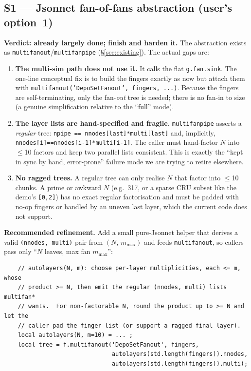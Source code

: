 \documentclass[11pt]{article}
\newcommand{\code}[1]{\texttt{#1}}
\begin{document}
\subsection{S1 --- Jsonnet fan-of-fans abstraction (user's option~1)}
\label{sec:s1}

\textbf{Verdict: already largely done; finish and harden it.}  The abstraction
exists as \code{multifanout}/\code{multifanpipe} (\S\ref{sec:existing}).  The
actual gaps are:

\begin{enumerate}
\item \textbf{The multi-sim path does not use it.}  It calls the flat
  \code{g.fan.sink}.  The one-line conceptual fix is to build the fingers exactly
  as now but attach them with \code{multifanout('DepoSetFanout', fingers, ...)}.
  Because the fingers are self-terminating, only the fan-\emph{out} tree is
  needed; there is no fan-in to size (a genuine simplification relative to the
  ``full'' mode).
\item \textbf{The layer lists are hand-specified and fragile.}  \code{multifanpipe}
  asserts a \emph{regular} tree:
  \code{npipe == nnodes[last]*multi[last]} and, implicitly,
  \code{nnodes[i]==nnodes[i-1]*multi[i-1]}.  The caller must hand-factor $N$ into
  $\le$10 factors and keep two parallel lists consistent.  This is exactly the
  ``kept in sync by hand, error-prone'' failure mode we are trying to retire
  elsewhere.
\item \textbf{No ragged trees.}  A regular tree can only realise $N$ that factor
  into $\le$10 chunks.  A prime or awkward $N$ (e.g.\ 317, or a sparse CRU subset
  like the demo's \code{[0,2]}) has no exact regular factorisation and must be
  padded with no-op fingers or handled by an uneven last layer, which the current
  code does not support.
\end{enumerate}

\noindent
\textbf{Recommended refinement.}  Add a small pure-Jsonnet helper that derives a
valid \code{(nnodes, multi)} pair from $(N,\,m_{\max})$ and feeds
\code{multifanout}, so callers pass only ``$N$ leaves, max fan $m_{\max}$'':

\begin{verbatim}
    // autolayers(N, m): choose per-layer multiplicities, each <= m, whose
    // product >= N, then emit the regular (nnodes, multi) lists multifan*
    // wants.  For non-factorable N, round the product up to >= N and let the
    // caller pad the finger list (or support a ragged final layer).
    local autolayers(N, m=10) = ... ;
    local tree = f.multifanout('DepoSetFanout', fingers,
                               autolayers(std.length(fingers)).nnodes,
                               autolayers(std.length(fingers)).multi);
\end{verbatim}
\end{document}
